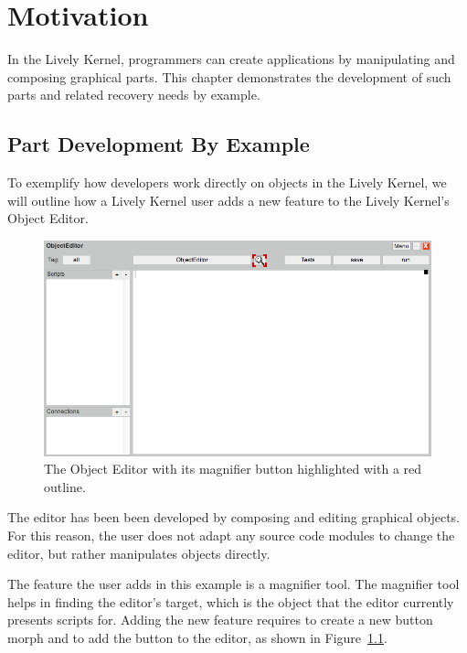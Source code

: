 \chapter{Motivation} \label{chapter:MOTIVATION}

In the Lively Kernel, programmers can create applications by manipulating and composing graphical parts.
This chapter demonstrates the development of such parts and related recovery needs by example.


\section{Part Development By Example}

To exemplify how developers work directly on objects in the Lively Kernel, we will outline how a Lively Kernel user adds a new feature to the Lively Kernel's Object Editor.

\begin{figure}[h]
    \centering
    \includegraphics[width=\textwidth]{figures/3_motivation/1_magnifierButton.png}
    \caption{The Object Editor with its magnifier button highlighted with a red outline.}
    \label{fig:MagnifierButton}
\end{figure}

The editor has been been developed by composing and editing graphical objects.
For this reason, the user does not adapt any source code modules to change the editor, but rather manipulates objects directly.

The feature the user adds in this example is a magnifier tool.
The magnifier tool helps in finding the editor's target, which is the object that the editor currently presents scripts for.
Adding the new feature requires to create a new button morph and to add the button to the editor, as shown in Figure~\ref{fig:MagnifierButton}.

